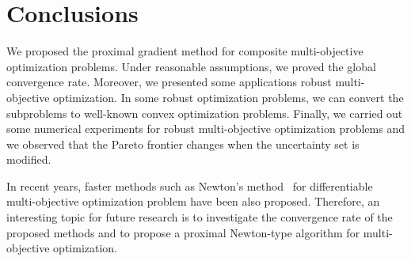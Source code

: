 \documentclass[../main]{subfiles}
\begin{document}
\section{Conclusions} 
We proposed the proximal gradient method for composite multi-objective optimization problems.
Under reasonable assumptions, we proved the global convergence rate.
Moreover, we presented some applications robust multi-objective optimization.
In some robust optimization problems, we can convert the subproblems to well-known convex optimization problems.
Finally, we carried out some numerical experiments for robust multi-objective optimization problems and we observed that the Pareto frontier changes when the uncertainty set is modified.

In recent years, faster methods such as Newton's method~\cite{Fliege2009} for differentiable multi-objective optimization problem have been also proposed.
Therefore, an interesting topic for future research is to investigate the convergence rate of the proposed methods and to propose a proximal Newton-type algorithm for multi-objective optimization. 
\end{document}
